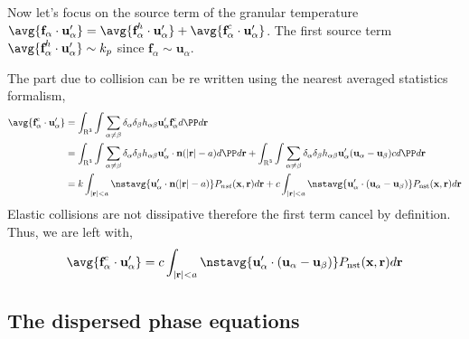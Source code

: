 Now let's focus on the source term of the granular temperature $\avg{\textbf{f}_\alpha\cdot \textbf{u}_\alpha'} = \avg{\textbf{f}_\alpha^h \cdot \textbf{u}_\alpha'} + \avg{\textbf{f}_\alpha^c\cdot \textbf{u}_\alpha'}$. 
The first source term $\avg{\textbf{f}_\alpha^h \cdot \textbf{u}_\alpha'} \sim k_p$ since $\textbf{f}_\alpha \sim \textbf{u}_\alpha$.

The part due to collision can be re written using the nearest averaged statistics formalism, 
\begin{align*}
    \avg{\textbf{f}_\alpha^c\cdot \textbf{u}_\alpha'}
    &= \int_{\textsc{R}^3}
    \int \sum_{\alpha \neq \beta} \delta_\alpha \delta_\beta h_{\alpha\beta}
    \textbf{u}'_\alpha \textbf{f}_\alpha^c d\PP d\textbf{r}\\
    &= \int_{\textsc{R}^3}
    \int \sum_{\alpha \neq \beta} \delta_\alpha \delta_\beta h_{\alpha\beta}
    \textbf{u}'_\alpha \cdot \textbf{n}
        (|\textbf{r}| - a) 
     d\PP d\textbf{r}
    + \int_{\textsc{R}^3}
    \int \sum_{\alpha \neq \beta} \delta_\alpha \delta_\beta h_{\alpha\beta}
    \textbf{u}'_\alpha 
         (\textbf{u}_\alpha - \textbf{u}_\beta) c
     d\PP d\textbf{r}\\
    &=k \int_{|\textbf{r}|<a}
    \nstavg{\textbf{u}'_\alpha \cdot \textbf{n}
        (|\textbf{r}| - a)   }
        P_{nst}(\textbf{x},\textbf{r})
     d\textbf{r}
    +c \int_{|\textbf{r}|<a}
        \nstavg{\textbf{u}'_\alpha 
         \cdot (\textbf{u}_\alpha - \textbf{u}_\beta)} P_\text{nst}(\textbf{x},\textbf{r})
     d\textbf{r}\\
\end{align*}
Elastic collisions are not dissipative therefore the first term cancel by definition. 
Thus, we are left with, 
\begin{align*}
    \avg{\textbf{f}_\alpha^c\cdot \textbf{u}_\alpha'}
    = c \int_{|\textbf{r}|<a}
        \nstavg{\textbf{u}'_\alpha 
         \cdot (\textbf{u}_\alpha - \textbf{u}_\beta)} P_\text{nst}(\textbf{x},\textbf{r})
     d\textbf{r} 
\end{align*}
\subsection{The dispersed phase equations}

